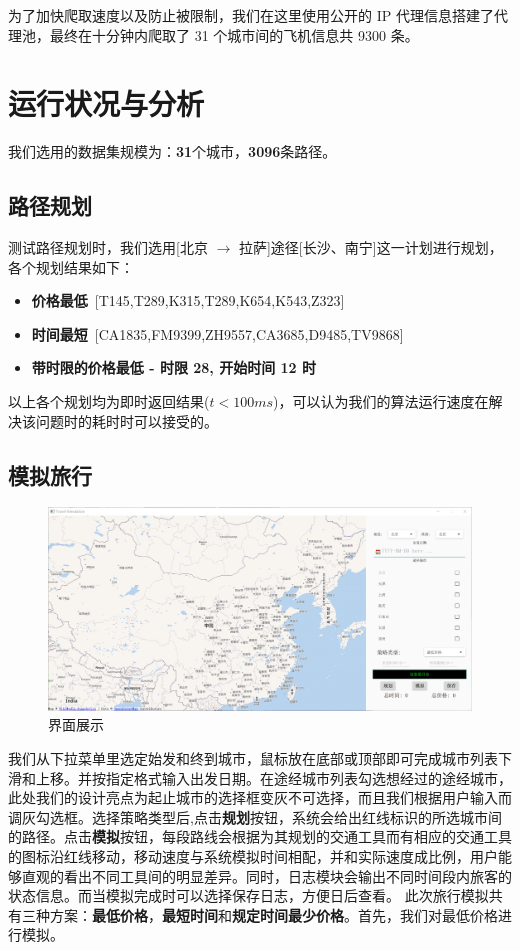 \documentclass[lang=cn,blue,13pt]{elegantbook}
\begin{document}
为了加快爬取速度以及防止被限制，我们在这里使用公开的 IP 代理信息搭建了代理池，最终在十分钟内爬取了 31 个城市间的飞机信息共 9300 条。

\chapter{运行状况与分析}
我们选用的数据集规模为：\textbf{31}个城市，\textbf{3096}条路径。

\section{路径规划}
测试路径规划时，我们选用[北京 $\to$ 拉萨]途径[长沙、南宁]这一计划进行规划，各个规划结果如下：

\begin{itemize}
	\item \textbf{价格最低}\ [T145,T289,K315,T289,K654,K543,Z323]
	\item \textbf{时间最短}\ [CA1835,FM9399,ZH9557,CA3685,D9485,TV9868]
	\item \textbf{带时限的价格最低 - 时限 28, 开始时间 12 时}\newline [CZ3128,CZ3130,D3634,ZH3886,3U8936,CZ8165]
\end{itemize}

以上各个规划均为即时返回结果($t < 100ms$)，可以认为我们的算法运行速度在解决该问题时的耗时时可以接受的。

\section{模拟旅行}

\begin{figure}[!htbp]
	\centering
	\includegraphics[width=1\textwidth]{beforestart.png}
	\caption{界面展示}
	\label{beforestart}
\end{figure}

我们从下拉菜单里选定始发和终到城市，鼠标放在底部或顶部即可完成城市列表下滑和上移。并按指定格式输入出发日期。在途经城市列表勾选想经过的途经城市，此处我们的设计亮点为起止城市的选择框变灰不可选择，而且我们根据用户输入而调灰勾选框。选择策略类型后,点击\textbf{规划}按钮，系统会给出红线标识的所选城市间的路径。点击\textbf{模拟}按钮，每段路线会根据为其规划的交通工具而有相应的交通工具的图标沿红线移动，移动速度与系统模拟时间相配，并和实际速度成比例，用户能够直观的看出不同工具间的明显差异。同时，日志模块会输出不同时间段内旅客的状态信息。而当模拟完成时可以选择保存日志，方便日后查看。
此次旅行模拟共有三种方案：\textbf{最低价格}，\textbf{最短时间}和\textbf{规定时间最少价格}。首先，我们对最低价格进行模拟。
\end{document}
